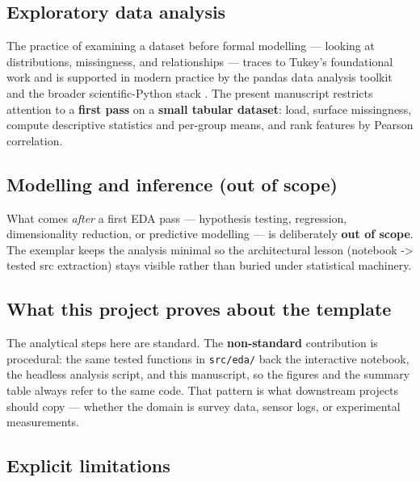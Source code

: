 \documentclass[
]{article}
\begin{document}
\subsection{Exploratory data analysis}\label{exploratory-data-analysis}

The practice of examining a dataset before formal modelling --- looking
at distributions, missingness, and relationships --- traces to Tukey's
foundational work \citep{tukey1977eda} and is supported in modern
practice by the pandas data analysis toolkit \citep{mckinney2010pandas}
and the broader scientific-Python stack \citep{harris2020numpy}. The
present manuscript restricts attention to a \textbf{first pass} on a
\textbf{small tabular dataset}: load, surface missingness, compute
descriptive statistics and per-group means, and rank features by Pearson
correlation.

\subsection{Modelling and inference (out of
scope)}\label{modelling-and-inference-out-of-scope}

What comes \emph{after} a first EDA pass --- hypothesis testing,
regression, dimensionality reduction, or predictive modelling --- is
deliberately \textbf{out of scope}. The exemplar keeps the analysis
minimal so the architectural lesson (notebook -\textgreater{} tested src
extraction) stays visible rather than buried under statistical
machinery.

\subsection{What this project proves about the
template}\label{what-this-project-proves-about-the-template}

The analytical steps here are standard. The \textbf{non-standard}
contribution is procedural: the same tested functions in
\texttt{src/eda/} back the interactive notebook, the headless analysis
script, and this manuscript, so the figures and the summary table always
refer to the same code. That pattern is what downstream projects should
copy --- whether the domain is survey data, sensor logs, or experimental
measurements.

\subsection{Explicit limitations}\label{explicit-limitations}
\end{document}
